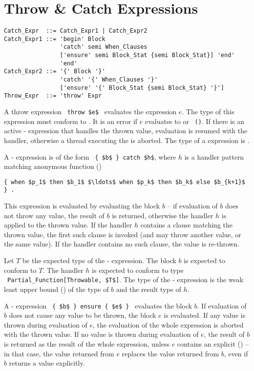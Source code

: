 \section{Throw \& Catch Expressions}
\label{sec:throw-catch-expressions}

\syntax\begin{lstlisting}
Catch_Expr  ::= Catch_Expr1 | Catch_Expr2
Catch_Expr1 ::= 'begin' Block 
                'catch' semi When_Clauses
                ['ensure' semi Block_Stat {semi Block_Stat}] 'end'
                'end'
Catch_Expr2 ::= '{' Block '}'
                'catch' '{' When_Clauses '}'
                ['ensure' '{' Block_Stat {semi Block_Stat} '}']
Throw_Expr  ::= 'throw' Expr
\end{lstlisting}

A throw expression ~\lstinline!throw $e$!~ evaluates the expression $e$. The type of this expression must conform to . It is an error if $e$ evaluates to  or ~\lstinline!()!. If there is an active - expression that handles the thrown value, evaluation is resumed with the handler, otherwise a thread executing the  is aborted. The type of a  expression is . 

A - expression is of the form ~\lstinline!{ $b$ } catch $h$!, where $h$ is a handler pattern matching anonymous function ()
\begin{lstlisting}
{ when $p_1$ then $b_1$ $\ldots$ when $p_k$ then $b_k$ else $b_{k+1}$ } .
\end{lstlisting}

This expression is evaluated by evaluating the block $b$ -- if evaluation of $b$ does not throw any value, the result of $b$ is returned, otherwise the handler $h$ is applied to the thrown value. If the handler $h$ contains a  clause matching the thrown value, the first such clause is invoked (and may throw another value, or the same value). If the handler contains no such clause, the value is re-thrown. 

Let $T$ be the expected type of the - expression. The block $b$ is expected to conform to $T$. The handler $h$ is expected to conform to type ~\lstinline!Partial_Function[Throwable, $T$]!. The type of the - expression is the weak least upper bound () of the type of $b$ and the result type of $h$. 

A - expression ~\lstinline!{ $b$ } ensure { $e$ }!~ evaluates the block $b$. If evaluation of $b$ does not cause any value to be thrown, the block $e$ is evaluated. If any value is thrown during evaluation of $e$, the evaluation of the whole expression is aborted with the thrown value. If no value is thrown during evaluation of $e$, the result of $b$ is returned as the result of the whole expression, unless $e$ contains an explicit  () -- in that case, the value returned from $e$ replaces the value returned from $b$, even if $b$ returns a value explicitly. 

